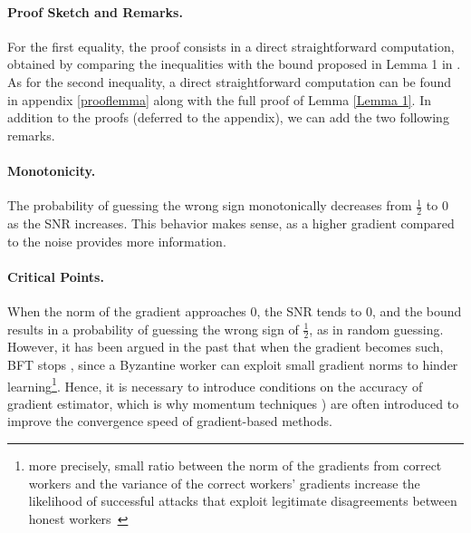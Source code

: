 \paragraph{Proof Sketch and Remarks.} For the first equality, the proof consists in a direct straightforward computation, obtained by comparing the inequalities with the bound proposed in Lemma 1 in \cite{bernstein2018signsgd}. As for the second inequality, a direct straightforward computation can be found in appendix \ref{prooflemma} along with the full proof of Lemma \ref{Lemma 1}. In addition to the proofs (deferred to the appendix), we can add the two following remarks.

\paragraph{Monotonicity.} The probability of guessing the wrong sign monotonically decreases from $\frac{1}{2}$ to 0 as the SNR increases. This behavior makes sense, as a higher gradient compared to the noise provides more information.

\paragraph{Critical Points.} When the norm of the gradient approaches 0, the SNR tends to 0, and the bound results in a probability of guessing the wrong sign of $\frac{1}{2}$, as in random guessing. However, it has been argued in the past that when the gradient becomes such, BFT stops \cite{mhamdi2018hidden, baruch2019little}, since a Byzantine worker can exploit small gradient norms to hinder learning\footnote{more precisely, small ratio between the norm of the gradients from correct workers and the variance of the correct workers' gradients increase the likelihood of successful attacks that exploit legitimate disagreements between honest workers~\cite{momentum}}. Hence, it is necessary to introduce conditions on the accuracy of gradient estimator, which is why momentum techniques \cite{momentum}) are often introduced to improve the convergence speed of gradient-based methods.


